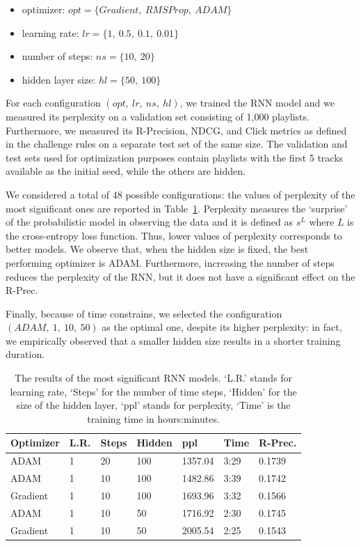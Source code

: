 \begin{itemize}
\item optimizer: $opt = \{Gradient,\ RMSProp,\ ADAM\}$
\item learning rate: $lr = \{1,\ 0.5,\ 0.1,\ 0.01\}$
\item number of steps: $ns = \{10,\ 20\}$
\item hidden layer size: $hl = \{50,\ 100\}$ 
\end{itemize}

For each configuration $(opt,\ lr,\ ns,\ hl)$, we trained the RNN model and we measured its perplexity on a validation set consisting of 1,000 playlists. Furthermore, we measured its R-Precision, NDCG, and Click metrics as defined in the challenge rules on a separate test set of the same size. The validation and test sets used for optimization purposes contain playlists with the first 5 tracks available as the initial seed, while the others are hidden.

We considered a total of 48 possible configurations: the values of perplexity of the most significant ones are reported in Table~\ref{rnn:tab:rnn_opt}. Perplexity measures the `surprise' of the probabilistic model in observing the data and it is defined as $s^{L}$ where $L$ is the cross-entropy loss function. Thus, lower values of perplexity corresponds to better models. We observe that, when the hidden size is fixed, the best performing optimizer is ADAM. Furthermore, increasing the number of steps reduces the perplexity of the RNN, but it does not have a significant effect on the R-Prec.

Finally, because of time constrains, we selected the configuration $(ADAM,\allowbreak\ 1,\allowbreak\ 10,\allowbreak\ 50)$ as the optimal one, despite its higher perplexity: in fact, we empirically observed that a smaller hidden size results in a shorter training duration.

\begin{table}
\centering
\begin{tabular}{@{}lllllll@{}}
\toprule
Optimizer & L.R. & Steps & Hidden  & ppl     & Time & R-Prec. \\ \midrule
ADAM      & 1    & 20    & 100     & 1357.04 & 3:29 & 0.1739  \\
ADAM      & 1    & 10    & 100     & 1482.86 & 3:39 & 0.1742  \\
Gradient  & 1    & 10    & 100     & 1693.96 & 3:32 & 0.1566  \\
ADAM      & 1    & 10    & 50      & 1716.92 & 2:30 & 0.1745  \\
Gradient  & 1    & 10    & 50      & 2005.54 & 2:25 & 0.1543  \\ \bottomrule
\end{tabular}
\caption[Results of the RNN models]{The results of the most significant RNN models. `L.R.' stands for learning rate, `Steps' for the number of time steps, `Hidden' for the size of the hidden layer, `ppl' stands for perplexity, `Time' is the training time in hours:minutes.}
\label{rnn:tab:rnn_opt}
\end{table}

